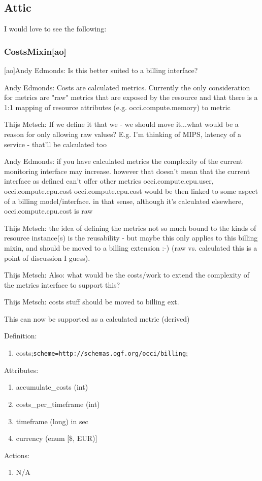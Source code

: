 \documentclass[12pt]{article}  %
\begin{document}
\subsection*{Attic}

I would love to see the following:
\subsubsection*{CostsMixin[ao]}

{
\color{blue}
[ao]Andy Edmonds:
Is this better suited to a billing interface?

Andy Edmonds:
Costs are calculated metrics. Currently the only consideration for metrics are "raw" metrics that are exposed by the resource and that there is a 1:1 mapping of resource attributes (e.g. occi.compute.memory) to metric

Thijs Metsch:
If we define it that we - we should move it...what would be a reason for only allowing raw values? E.g. I'm thinking of MIPS, latency of a service  - that'll be calculated too

Andy Edmonds:
if you have calculated metrics the complexity of the current monitoring interface may increase.
however that doesn't mean that the current interface as defined can't offer other metrics
occi.compute.cpu.user, occi.compute.cpu.cost
occi.compute.cpu.cost would be then linked to some aspect of a billing model/interface.
in that sense, although it's calculated elsewhere, occi.compute.cpu.cost is raw

Thijs Metsch:
the idea of defining the metrics not so much bound to the kinds of resource instance(s) is the reusability - but maybe this only applies to this billing mixin, and should be moved to a billing extension :-) (raw vs. calculated this is a point of discussion I guess).

Thijs Metsch:
Also: what would be the costs/work to extend the complexity of the metrics interface to support this?

Thijs Metsch:
costs stuff should be moved to billing ext.
}


This can now be supported as a calculated metric (derived)

Definition:
\begin{enumerate}
\item costs;\verb|scheme=http://schemas.ogf.org/occi/billing|;
\end{enumerate}

Attributes:
\begin{enumerate}
\item accumulate\_costs (int)
\item costs\_per\_timeframe (int)
\item timeframe (long) in sec
\item currency (enum [\$, EUR)]
\end{enumerate}

Actions:
\begin{enumerate}
\item N/A
\end{enumerate}
\end{document}
